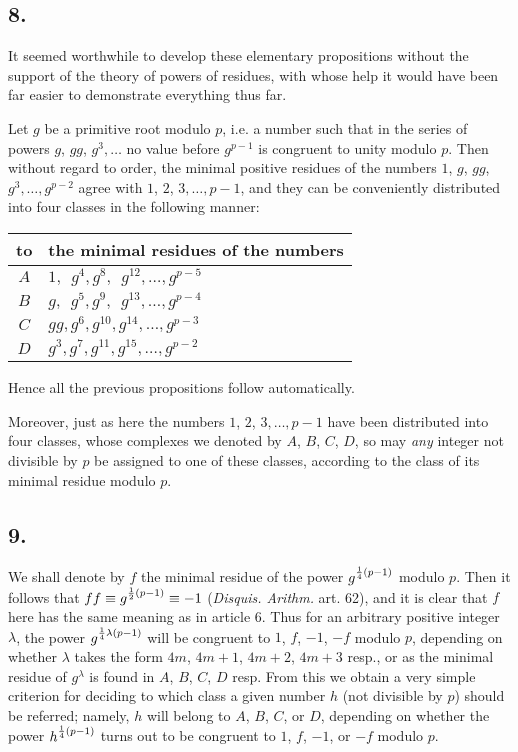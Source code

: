 \documentclass[twoside,12pt]{memoir}
\let\oldfrac\frac
\def\frac#1#2{\mathchoice{\tfrac{#1}{#2}}{\oldfrac{#1}{#2}}{\genfrac{}{}{}{2}{#1}{#2\mathstrut}}{\genfrac{}{}{}{3}{#1}{#2\mathstrut}}}
\begin{document}
\subsection*{8.}

It seemed worthwhile to develop these elementary propositions without the support of the theory of powers of residues, with whose help it would have been far easier to demonstrate everything thus far.

Let \(g\) be a primitive root modulo \(p\), i{.}e{.} a number such that in the series of powers \(g\), \(g g\), \(g^3, \ldots\) no value before \(g^{p-1}\) is congruent to unity modulo \(p\). Then without regard to order, the minimal positive residues of the numbers \(1\), \(g\), \(g g\), \(g^3, \ldots, g^{p-2}\) agree with \(1\), \(2\), \(3, \ldots, p-1\), and they can be conveniently distributed into four classes in the following manner:\pagebreak%
\begin{center}
\begin{tabular}{c|l}
to & the minimal residues of the numbers \\
\hline
\(A\) & \(1, \phantom{g}g^4, g^8, \phantom{g}g^{12}, \ldots, g^{p-5}\) \\
\(B\) & \(g, \phantom{g}g^5, g^9, \phantom{g}g^{13}, \ldots, g^{p-4}\) \\
\(C\) & \(g g, g^6, g^{10}, g^{14}, \ldots, g^{p-3}\) \\
\(D\) & \(g^3, g^7, g^{11}, g^{15}, \ldots, g^{p-2}\) \\
\end{tabular}
\end{center}

Hence all the previous propositions follow automatically.

Moreover, just as here the numbers \(1\), \(2\), \(3, \ldots, p-1\) have been distributed into four classes, whose complexes we denoted by \(A\), \(B\), \(C\), \(D\), so may \textit{any} integer not divisible by \(p\) be assigned to one of these classes, according to the class of its minimal residue modulo \(p\).

\subsection*{9.}

We shall denote by \(f\) the minimal residue of the power \(g^{\frac{1}{4}(p-1)}\) modulo \(p\).  Then it follows that \(f f \equiv g^{\frac{1}{2}(p-1)} \equiv -1\) (\textit{Disquis. Arithm.} art. 62), and it is clear that \(f\) here has the same meaning as in article 6.  Thus for an arbitrary positive integer \(\lambda\), the power \(g^{\frac{1}{4} \lambda(p-1)}\) will be congruent  to \(1\), \(f\), \(-1\), \(-f\) modulo \(p\), depending on whether \(\lambda\) takes the form \(4m\), \(4m+1\), \(4m+2\), \(4m+3\) resp{.}, or as the minimal residue of \(g^{\lambda}\) is found in \(A\), \(B\), \(C\), \(D\) resp.  From this we obtain a very simple criterion for deciding to which class a given number \(h\) (not divisible by \(p\)) should be referred; namely, \(h\) will belong to \(A\), \(B\), \(C\), or \(D\), depending on whether the power \(h^{\frac{1}{4}(p-1)}\) turns out to be congruent to \(1\), \(f\), \(-1\), or \(-f\) modulo \(p\).
\end{document}
